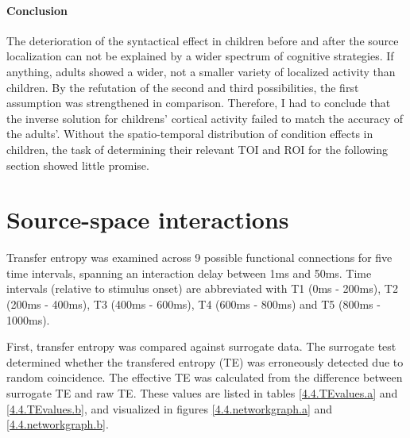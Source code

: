\paragraph{Conclusion}
The deterioration of the syntactical effect in children before and after the source localization can not be explained by a wider spectrum of cognitive strategies.
If anything, adults showed a wider, not a smaller variety of localized activity than children.
By the refutation of the second and third possibilities, the first assumption was strengthened in comparison.
Therefore, I had to conclude that the inverse solution for childrens' cortical activity failed to match the accuracy of the adults'.
Without the spatio-temporal distribution of condition effects in children, the task of determining their relevant TOI and ROI for the following section showed little promise.\section{Source-space interactions}

Transfer entropy was examined across 9 possible functional connections for five time intervals, spanning an interaction delay between 1ms and 50ms.
Time intervals (relative to stimulus onset) are abbreviated with T1 (0ms - 200ms), T2 (200ms - 400ms), T3 (400ms - 600ms), T4 (600ms - 800ms) and T5 (800ms - 1000ms).

First, transfer entropy was compared against surrogate data.
The surrogate test determined whether the transfered entropy (TE) was erroneously detected due to random coincidence.
The effective TE was calculated from the difference between surrogate TE and raw TE.
These values are listed in tables \ref{4.4.TEvalues.a} and \ref{4.4.TEvalues.b}, and visualized in figures \ref{4.4.networkgraph.a} and \ref{4.4.networkgraph.b}.

